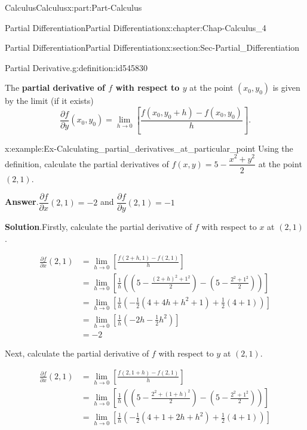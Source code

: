 \documentclass[oneside,10pt,]{book}
\newcommand{\blocktitlefont}{\relax}
\newcommand{\terminology}[1]{\textbf{#1}}
\numberwithin{equation}{section}
\newcommand{\amp}{&}
\begin{document}
\begin{partptx}{Calculus}{}{Calculus}{}{}{x:part:Part-Calculus}
\begin{chapterptx}{Partial Differentiation}{}{Partial Differentiation}{}{}{x:chapter:Chap-Calculus_4}
\begin{sectionptx}{Partial Differentiation}{}{Partial Differentiation}{}{}{x:section:Sec-Partial_Differentiation}
\begin{definition}{Partial Derivative.}{g:definition:id545830}
\begin{equation*}
\end{equation*}
%
\par
The \terminology{partial derivative of \(f\) with respect to \(y\)} at the point \((x_0,y_0)\) is given by the limit (if it exists)%
\begin{equation*}
\frac{\partial f}{\partial y} (x_0,y_0) = \lim_{h \to 0} \left[ \frac{f(x_0,y_0+h)-f(x_0,y_0)}{h} \right]\text{.}
\end{equation*}
%
\end{definition}
\begin{example}{}{x:example:Ex-Calculating_partial_derivatives_at_particular_point}%
Using the definition, calculate the partial derivatives of \(f(x,y) = 5 - \dfrac{x^2+y^2}{2}\) at the point \((2,1)\).%
\par\smallskip%
\noindent\textbf{\blocktitlefont Answer}.\hypertarget{g:answer:id545867}{}\quad{}\(\dfrac{\partial f}{\partial x}(2,1) = -2\) and \(\dfrac{\partial f}{\partial y}(2,1) = -1\)%
\par\smallskip%
\noindent\textbf{\blocktitlefont Solution}.\hypertarget{g:solution:id545879}{}\quad{}Firstly, calculate the partial derivative of \(f\) with respect to \(x\) at \((2,1)\).%
\par
%
\begin{align*}
\frac{\partial f}{\partial x}(2,1) \amp = \lim_{h \to 0} \left[ \frac{f(2+h,1)-f(2,1)}{h} \right]\\
\amp = \lim_{h \to 0} \left[\frac{1}{h} \left( \left( 5 - \frac{(2+h)^2 + 1^2}{2} \right) - \left( 5 - \frac{2^2+1^2}{2} \right) \right) \right]\\
\amp = \lim_{h \to 0} \left[\frac{1}{h} \left( -\frac{1}{2}(4+4h+h^2+1) +\frac{1}{2}(4+1) \right) \right]\\
\amp = \lim_{h \to 0} \left[ \frac{1}{h} \left(-2h-\frac{1}{2}h^2 \right) \right]\\
\amp = -2
\end{align*}
%
\par
Next, calculate the partial derivative of \(f\) with respect to \(y\) at \((2,1)\).%
\par
%
\begin{align*}
\frac{\partial f}{\partial x}(2,1) \amp = \lim_{h \to 0} \left[ \frac{f(2,1+h)-f(2,1)}{h} \right]\\
\amp = \lim_{h \to 0} \left[\frac{1}{h} \left( \left( 5 - \frac{2^2 + (1+h)^2}{2} \right) - \left( 5 - \frac{2^2+1^2}{2} \right) \right) \right]\\
\amp = \lim_{h \to 0} \left[\frac{1}{h} \left( -\frac{1}{2}(4+1+2h+h^2) +\frac{1}{2}(4+1) \right) \right]\\

\end{align*}
\end{example}
\end{sectionptx}
\end{chapterptx}
\end{partptx}
\end{document}
